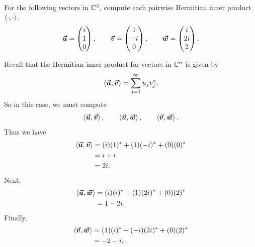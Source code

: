 \documentclass[12pt]{article} %
\begin{document}
\newpage
\begin{problem}
	For the following vectors in $\mathbb{C}^3$, compute each pairwise Hermitian inner product $\left\langle \cdot, \cdot \right\rangle$.  
	\[
		\boldsymbol{\vec{u}} = \begin{pmatrix} i \\ 1 \\ 0 \end{pmatrix}, \qquad \boldsymbol{\vec{v}} = \begin{pmatrix} 1 \\ -i \\ 0 \end{pmatrix}, \qquad \boldsymbol{\vec{w}} = \begin{pmatrix} i \\ 2i \\ 2 \end{pmatrix}.
	\]
\end{problem}
\begin{solution}
	Recall that the Hermitian inner product for vectors in $\mathbb{C}^n$ is given by
	\[
	\left\langle \boldsymbol{\vec{u}}, \boldsymbol{\vec{v}} \right\rangle = \sum_{j=1}^\infty u_j v_j^*.
	\]
	So in this case, we must compute
	\[
	\left\langle \boldsymbol{\vec{u}}, \boldsymbol{\vec{v}} \right\rangle, \qquad \left\langle \boldsymbol{\vec{u}}, \boldsymbol{\vec{w}} \right\rangle, \qquad \left\langle \boldsymbol{\vec{v}}, \boldsymbol{\vec{w}} \right\rangle.
	\]
	Thus we have
	\begin{align*}
		\left\langle \boldsymbol{\vec{u}}, \boldsymbol{\vec{v}} \right\rangle &= (i)(1)^*+(1)(-i)^*+(0)(0)^*\\
			&= i +i\\
			&= 2i.
	\end{align*}
	Next,
		\begin{align*}
			\left\langle \boldsymbol{\vec{u}}, \boldsymbol{\vec{w}} \right\rangle &= (i)(i)^*+(1)(2i)^*+(0)(2)^*\\
				&= 1-2i.
		\end{align*}
	Finally,
	\begin{align*}
		\left\langle \boldsymbol{\vec{v}}, \boldsymbol{\vec{w}} \right\rangle &= (1)(i)^*+(-i)(2i)^*+(0)(2)^*\\
		&=-2-i.
	\end{align*}
\end{solution}
\end{document}
